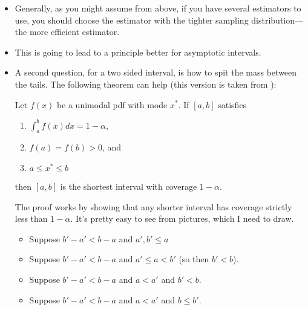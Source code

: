 \begin{itemize}

\item Generally, as you might assume from above, if you have several
  estimators to use, you should choose the estimator with the tighter
  sampling distribution—the more efficient estimator.

\item This is going to lead to a principle better for asymptotic
  intervals.

\item A second question, for a two sided interval, is how to spit the
  mass between the tails.  The following theorem can help (this
  version is taken from \citealp{CB02}):

  \begin{thm}
    Let $f(x)$ be a unimodal pdf with mode $x^*$.  If $[a,b]$
    satisfies
    \begin{enumerate}
    \item $∫_a^b f(x) dx = 1 - α$,
    \item $f(a) = f(b) > 0$, and
    \item $a ≤ x^* ≤ b$
    \end{enumerate}
    then $[a,b]$ is the shortest interval with coverage $1-α$.
  \end{thm}

  The proof works by showing that any shorter interval has coverage
  strictly less than $1-α$.  It's pretty easy to see from pictures,
  which I need to draw.

  \begin{itemize}
  \item Suppose $b'-a' < b-a$ and $a', b' ≤ a$
  \item Suppose $b'-a' < b-a$ and $a' ≤ a < b'$ (so then $b' < b$).
  \item Suppose $b'-a' < b-a$ and $a < a'$ and $b' < b$.
  \item Suppose $b'-a' < b-a$ and $a < a'$ and $b ≤ b'$.
  \end{itemize}

\end{itemize}

